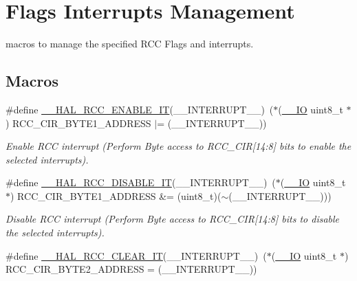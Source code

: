 \hypertarget{group___r_c_c___flags___interrupts___management}{}\section{Flags Interrupts Management}
\label{group___r_c_c___flags___interrupts___management}


macros to manage the specified R\+CC Flags and interrupts.  


\subsection*{Macros}
\begin{DoxyCompactItemize}
\item 
\#define \mbox{\hyperlink{group___r_c_c___flags___interrupts___management_ga180fb20a37b31a6e4f7e59213a6c0405}{\+\_\+\+\_\+\+H\+A\+L\+\_\+\+R\+C\+C\+\_\+\+E\+N\+A\+B\+L\+E\+\_\+\+IT}}(\+\_\+\+\_\+\+I\+N\+T\+E\+R\+R\+U\+P\+T\+\_\+\+\_\+)~($\ast$(\mbox{\hyperlink{core__sc300_8h_aec43007d9998a0a0e01faede4133d6be}{\+\_\+\+\_\+\+IO}} uint8\+\_\+t $\ast$) R\+C\+C\+\_\+\+C\+I\+R\+\_\+\+B\+Y\+T\+E1\+\_\+\+A\+D\+D\+R\+E\+SS $\vert$= (\+\_\+\+\_\+\+I\+N\+T\+E\+R\+R\+U\+P\+T\+\_\+\+\_\+))
\begin{DoxyCompactList}\small\item\em Enable R\+CC interrupt (Perform Byte access to R\+C\+C\+\_\+\+C\+IR\mbox{[}14\+:8\mbox{]} bits to enable the selected interrupts). \end{DoxyCompactList}\item 
\#define \mbox{\hyperlink{group___r_c_c___flags___interrupts___management_gafc4df8cd4df0a529d11f18bf1f7e9f50}{\+\_\+\+\_\+\+H\+A\+L\+\_\+\+R\+C\+C\+\_\+\+D\+I\+S\+A\+B\+L\+E\+\_\+\+IT}}(\+\_\+\+\_\+\+I\+N\+T\+E\+R\+R\+U\+P\+T\+\_\+\+\_\+)~($\ast$(\mbox{\hyperlink{core__sc300_8h_aec43007d9998a0a0e01faede4133d6be}{\+\_\+\+\_\+\+IO}} uint8\+\_\+t $\ast$) R\+C\+C\+\_\+\+C\+I\+R\+\_\+\+B\+Y\+T\+E1\+\_\+\+A\+D\+D\+R\+E\+SS \&= (uint8\+\_\+t)($\sim$(\+\_\+\+\_\+\+I\+N\+T\+E\+R\+R\+U\+P\+T\+\_\+\+\_\+)))
\begin{DoxyCompactList}\small\item\em Disable R\+CC interrupt (Perform Byte access to R\+C\+C\+\_\+\+C\+IR\mbox{[}14\+:8\mbox{]} bits to disable the selected interrupts). \end{DoxyCompactList}\item 
\#define \mbox{\hyperlink{group___r_c_c___flags___interrupts___management_ga9d8ab157f58045b8daf8136bee54f139}{\+\_\+\+\_\+\+H\+A\+L\+\_\+\+R\+C\+C\+\_\+\+C\+L\+E\+A\+R\+\_\+\+IT}}(\+\_\+\+\_\+\+I\+N\+T\+E\+R\+R\+U\+P\+T\+\_\+\+\_\+)~($\ast$(\mbox{\hyperlink{core__sc300_8h_aec43007d9998a0a0e01faede4133d6be}{\+\_\+\+\_\+\+IO}} uint8\+\_\+t $\ast$) R\+C\+C\+\_\+\+C\+I\+R\+\_\+\+B\+Y\+T\+E2\+\_\+\+A\+D\+D\+R\+E\+SS = (\+\_\+\+\_\+\+I\+N\+T\+E\+R\+R\+U\+P\+T\+\_\+\+\_\+))

\end{DoxyCompactItemize}
